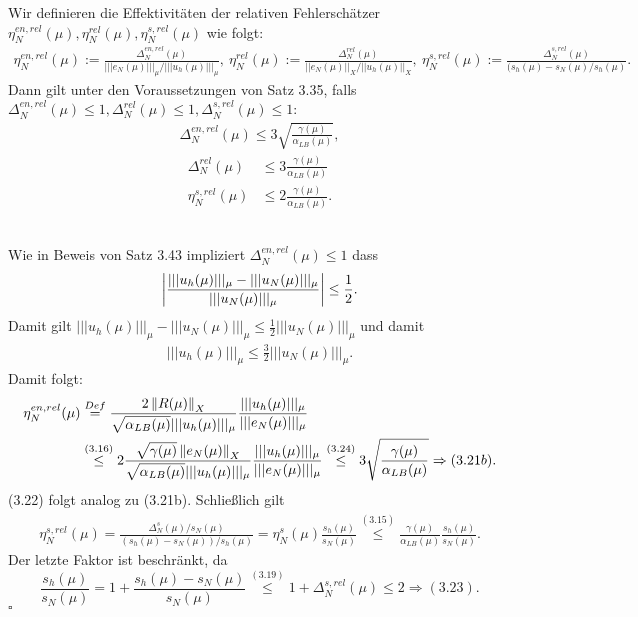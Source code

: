 Wir definieren die Effektivitäten der relativen Fehlerschätzer $\eta_N^{en,rel}(\mu),\eta_N^{rel}(\mu),\eta_N^{s,rel}(\mu)$ wie folgt:
\begin{align*}
\eta_N^{en,rel}(\mu) := \frac{\Delta_N^{en,rel}(\mu)}{|||e_N(\mu)|||_\mu / |||u_h(\mu)|||_\mu},~ \eta_N^{rel}(\mu) := \frac{\Delta_N^{rel}(\mu)}{||e_N(\mu)||_X / ||u_h(\mu)||_X},~ \eta_N^{s,rel}(\mu) := \frac{\Delta_N^{s,rel}(\mu)}{(s_h(\mu)-s_N(\mu)/ s_h(\mu)}.
\end{align*}
Dann gilt unter den Voraussetzungen von Satz 3.35, falls $\Delta_N^{en,rel}(\mu)\le 1,\Delta_N^{rel}(\mu)\le 1,\Delta_N^{s,rel}(\mu)\le 1$:
\begin{align*}
\Delta_N^{en,rel}(\mu) \le 3\sqrt{\frac{\gamma(\mu)}{\alpha_{LB}(\mu)}} \tag{3.21b},
\end{align*}
\begin{align}
\Delta_N^{rel}(\mu) &\le 3\frac{\gamma(\mu)}{\alpha_{LB}(\mu)}\\
\eta_N^{s,rel}(\mu) &\le 2\frac{\gamma(\mu)}{\alpha_{LB}(\mu)}.
\end{align}

\\
Wie in Beweis von Satz 3.43 impliziert $\Delta_N^{en,rel}(\mu)\le 1$ dass
\[
\left\vert\frac{|||u_h(\mu)|||_\mu-|||u_N(\mu)|||_\mu}{|||u_N(\mu)|||_\mu}\right\vert  \le \frac{1}{2}.
\]
Damit gilt $|||u_h(\mu)|||_\mu-|||u_N(\mu)|||_\mu \le \frac{1}{2} |||u_N(\mu)|||_\mu$ und damit
\begin{align}
|||u_h(\mu)|||_\mu \le \frac{3}{2} |||u_N(\mu)|||_\mu.
\end{align}
Damit folgt:
\begin{align*}
\eta_N^{en,rel}(\mu) &\stackrel{Def}{=} \frac{2\left\Vert R(\mu)\right\Vert_X}{\sqrt{\alpha_{LB}(\mu)}|||u_h(\mu)|||_\mu} \frac{|||u_h(\mu)|||_\mu}{|||e_N(\mu)|||_\mu}\\
&\stackrel{(3.16)}{\le} 2\frac{\sqrt{\gamma(\mu)}\left\Vert e_N(\mu)\right\Vert_X}{\sqrt{\alpha_{LB}(\mu)}|||u_h(\mu)|||_\mu} \frac{|||u_h(\mu)|||_\mu}{|||e_N(\mu)|||_\mu} \stackrel{(3.24)}{\le} 3 \sqrt{\frac{\gamma(\mu)}{\alpha_{LB}(\mu)}} \Rightarrow (3.21b).
\end{align*}
(3.22) folgt analog zu (3.21b).
Schließlich gilt
\begin{align*}
\eta_N^{s,rel}(\mu) = \frac{\Delta_N^s(\mu) / s_N(\mu)}{(s_h(\mu)-s_N(\mu)) / s_h(\mu)} = \eta_N^s(\mu) \frac{s_h(\mu)}{s_N(\mu)} \stackrel{(3.15)}{\le} \frac{\gamma(\mu)}{\alpha_{LB}(\mu)} \frac{s_h(\mu)}{s_N(\mu)}.
\end{align*}
Der letzte Faktor ist beschränkt, da
\[
\frac{s_h(\mu)}{s_N(\mu)} = 1 + \frac{s_h(\mu)-s_N(\mu)}{s_N(\mu)} \stackrel{(3.19)}{\le} 1 + \Delta_N^{s,rel}(\mu) \le 2 \Rightarrow (3.23).
\]
\hfill $\square$

